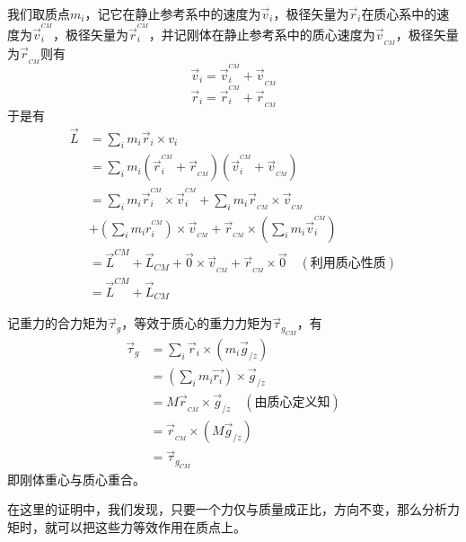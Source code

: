 \begin{prove}[$\vec{L}=\vec{L}_{CM}+\vec{L}^{CM}$]
	我们取质点$m_i$，记它在静止参考系中的速度为$\vec{v}_i$，极径矢量为$\vec{r}_i$在质心系中的速度为$\vec{v}^{^{CM}}_i$，极径矢量为$\vec{r}_i^{^{CM}}$，并记刚体在静止参考系中的质心速度为$\vec{v}_{_{CM}}$，极径矢量为$\vec{r}_{_{CM}}$则有
	\[\vec{v}_i=\vec{v}_i^{^{CM}}+\vec{v}_{_{CM}}\]
	\[\vec{r}_i=\vec{r}_i^{^{CM}}+\vec{r}_{_{CM}}\]
	于是有
	\begin{align*}
		\vec{L}&=\sum_im_i\vec{r}_i\times v_i\\
		&=\sum_im_i(\vec{r}_i^{^{CM}}+\vec{r}_{_{CM}})(\vec{v}_i^{^{CM}}+\vec{v}_{_{CM}})\\
		&=\sum_im_i\vec{r}_i^{^{CM}}\times\vec{v}_i^{^{CM}}+\sum_im_i\vec{r}_{_{CM}}\times\vec{v}_{_{CM}}\\
		&+(\sum_im_ir_i^{^{CM}})\times\vec{v}_{_{CM}}+\vec{r}_{_{CM}}\times(\sum_im_i\vec{v}_i^{^{CM}})\\
		&=\vec{L}^{CM}+\vec{L}_{CM}+\vec{0}\times\vec{v}_{_{CM}}+\vec{r}_{_{CM}}\times\vec{0}\quad(\text{利用质心性质})\\
		&=\vec{L}^{CM}+\vec{L}_{CM}
	\end{align*}
\end{prove}
\begin{prove}
	记重力的合力矩为$\vec{\tau}_{g}$，等效于质心的重力力矩为$\vec{\tau}_{g_{CM}}$，有
	\begin{align*}
		\vec{\tau}_g&=\sum_i\vec{r}_i\times(m_i\vec{g}_{/z})\\
		&=(\sum_im_i\vec{r_i})\times\vec{g}_{/z}\\
		&=M\vec{r}_{_{CM}}\times\vec{g}_{/z}\quad(\text{由质心定义知})\\
		&=\vec{r}_{_{CM}}\times(M\vec{g}_{/z})\\
		&=\vec{\tau}_{g_{CM}}
	\end{align*}
	即刚体重心与质心重合。
	
	在这里的证明中，我们发现，只要一个力仅与质量成正比，方向不变，那么分析力矩时，就可以把这些力等效作用在质点上。
\end{prove}
\newcommand{\base}[1]{\hat{\vec{#1}}}
